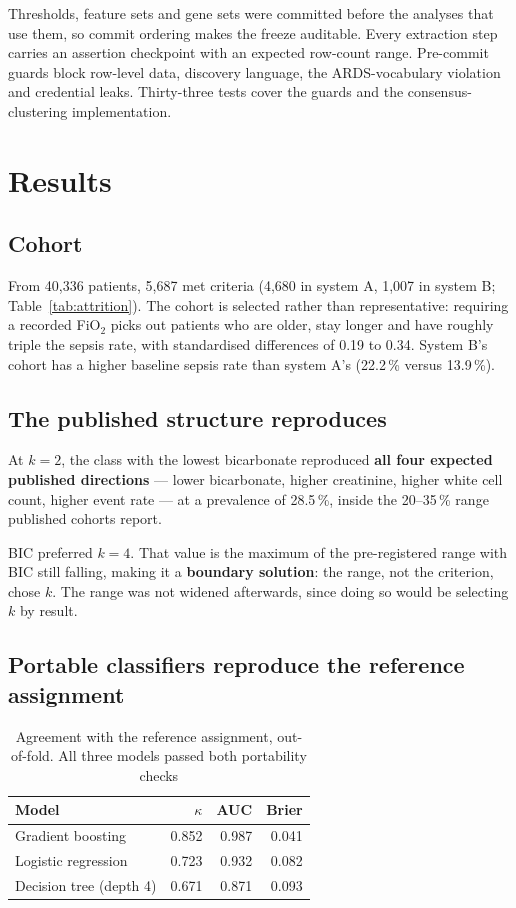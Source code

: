 \documentclass[11pt,letterpaper]{article}
\newcommand{\Fio}{FiO$_2$}
\begin{document}
Thresholds, feature sets and gene sets were committed before the analyses that use them, so
commit ordering makes the freeze auditable. Every extraction step carries an assertion
checkpoint with an expected row-count range. Pre-commit guards block row-level data,
discovery language, the ARDS-vocabulary violation and credential leaks. Thirty-three tests
cover the guards and the consensus-clustering implementation.

\section{Results}

\subsection{Cohort}

From 40,336 patients, 5,687 met criteria (4,680 in system A, 1,007 in system B;
Table~\ref{tab:attrition}). The cohort is selected rather than representative: requiring a
recorded \Fio{} picks out patients who are older, stay longer and have roughly triple the
sepsis rate, with standardised differences of 0.19 to 0.34. System B's cohort has a higher
baseline sepsis rate than system A's (22.2\,\% versus 13.9\,\%).

\subsection{The published structure reproduces}

At $k=2$, the class with the lowest bicarbonate reproduced \textbf{all four expected
published directions} --- lower bicarbonate, higher creatinine, higher white cell count,
higher event rate --- at a prevalence of 28.5\,\%, inside the 20--35\,\% range published
cohorts report.

BIC preferred $k=4$. That value is the maximum of the pre-registered range with BIC still
falling, making it a \textbf{boundary solution}: the range, not the criterion, chose $k$. The
range was not widened afterwards, since doing so would be selecting $k$ by result.

\subsection{Portable classifiers reproduce the reference assignment}

\begin{table}[H]
\centering\small
\begin{tabular}{lrrr}
\toprule
Model & $\kappa$ & AUC & Brier \\
\midrule
Gradient boosting & 0.852 & 0.987 & 0.041 \\
Logistic regression & 0.723 & 0.932 & 0.082 \\
Decision tree (depth 4) & 0.671 & 0.871 & 0.093 \\
\bottomrule
\end{tabular}
\caption{Agreement with the reference assignment, out-of-fold. All three models passed both
portability checks}
\label{tab:portable}
\end{table}
\end{document}
